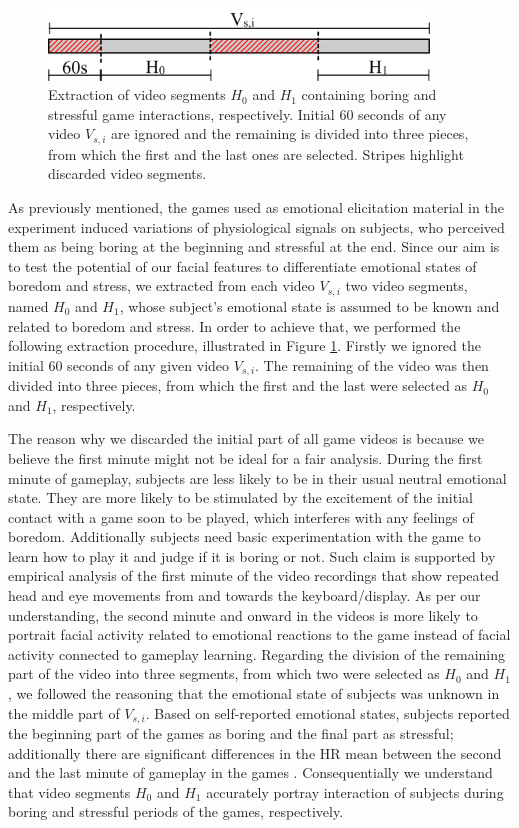 \begin{figure}
\centering
\includegraphics[width=0.9\textwidth]{figures/pre-processing}
\caption{Extraction of video segments $H_0$ and $H_1$ containing boring and stressful game interactions, respectively. Initial 60 seconds of any video $V_{s,i}$ are ignored and the remaining is divided into three pieces, from which the first and the last ones are selected. Stripes highlight discarded video segments.}
\label{fig:preprocessing}
\end{figure}

As previously mentioned, the games used as emotional elicitation material in the experiment induced variations of physiological signals on subjects, who perceived them as being boring at the beginning and stressful at the end. Since our aim is to test the potential of our facial features to differentiate emotional states of boredom and stress, we extracted from each video $V_{s,i}$ two video segments, named $H_0$ and $H_1$, whose subject's emotional state is assumed to be known and related to boredom and stress. In order to achieve that, we performed the following extraction procedure, illustrated in Figure \ref{fig:preprocessing}. Firstly we ignored the initial 60 seconds of any given video $V_{s,i}$. The remaining of the video was then divided into three pieces, from which the first and the last were selected as $H_0$ and $H_1$, respectively.

The reason why we discarded the initial part of all game videos is because we believe the first minute might not be ideal for a fair analysis. During the first minute of gameplay, subjects are less likely to be in their usual neutral emotional state. They are more likely to be stimulated by the excitement of the initial contact with a game soon to be played, which interferes with any feelings of boredom. Additionally subjects need basic experimentation with the game to learn how to play it and judge if it is boring or not. Such claim is supported by empirical analysis of the first minute of the video recordings that show repeated head and eye movements from and towards the keyboard/display. As per our understanding, the second minute and onward in the videos is more likely to portrait facial activity related to emotional reactions to the game instead of facial activity connected to gameplay learning. Regarding the division of the remaining part of the video into three segments, from which two were selected as $H_0$ and $H_1$, we followed the reasoning that the emotional state of subjects was unknown in the middle part of $V_{s,i}$. Based on self-reported emotional states, subjects reported the beginning part of the games as boring and the final part as stressful; additionally there are significant differences in the HR mean between the second and the last minute of gameplay in the games \cite{bevilacqua2018changes}. Consequentially we understand that video segments $H_0$ and $H_1$ accurately portray interaction of subjects during boring and stressful periods of the games, respectively.


